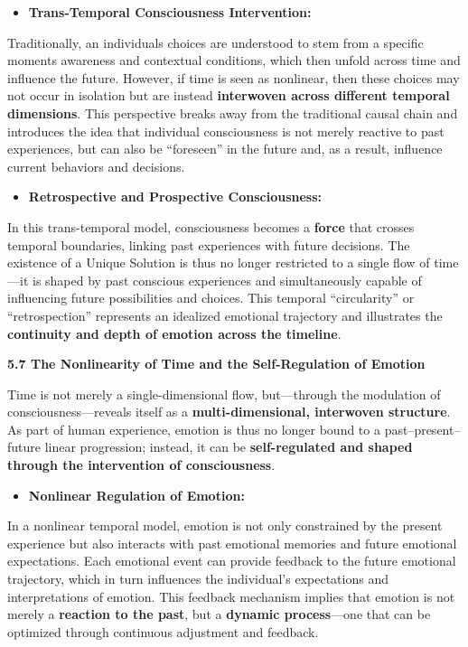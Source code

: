 \documentclass[
]{article}
\begin{document}
\begin{itemize}
\item
  \textbf{Trans-Temporal Consciousness Intervention:}
\end{itemize}

Traditionally, an individual\textquotesingle s choices are understood to
stem from a specific moment\textquotesingle s awareness and contextual
conditions, which then unfold across time and influence the future.
However, if time is seen as nonlinear, then these choices may not occur
in isolation but are instead \textbf{interwoven across different
temporal dimensions}. This perspective breaks away from the traditional
causal chain and introduces the idea that individual consciousness is
not merely reactive to past experiences, but can also be ``foreseen'' in
the future and, as a result, influence current behaviors and decisions.

\begin{itemize}
\item
  \textbf{Retrospective and Prospective Consciousness:}
\end{itemize}

In this trans-temporal model, consciousness becomes a \textbf{force}
that crosses temporal boundaries, linking past experiences with future
decisions. The existence of a Unique Solution is thus no longer
restricted to a single flow of time---it is shaped by past conscious
experiences and simultaneously capable of influencing future
possibilities and choices. This temporal ``circularity'' or
``retrospection'' represents an idealized emotional trajectory and
illustrates the \textbf{continuity and depth of emotion across the
timeline}.

\textbf{5.7 The Nonlinearity of Time and the Self-Regulation of Emotion}

Time is not merely a single-dimensional flow, but---through the
modulation of consciousness---reveals itself as a
\textbf{multi-dimensional, interwoven structure}. As part of human
experience, emotion is thus no longer bound to a past--present--future
linear progression; instead, it can be \textbf{self-regulated and shaped
through the intervention of consciousness}.

\begin{itemize}
\item
  \textbf{Nonlinear Regulation of Emotion:}
\end{itemize}

In a nonlinear temporal model, emotion is not only constrained by the
present experience but also interacts with past emotional memories and
future emotional expectations. Each emotional event can provide feedback
to the future emotional trajectory, which in turn influences the
individual's expectations and interpretations of emotion. This feedback
mechanism implies that emotion is not merely a \textbf{reaction to the
past}, but a \textbf{dynamic process}---one that can be optimized
through continuous adjustment and feedback.
\end{document}
